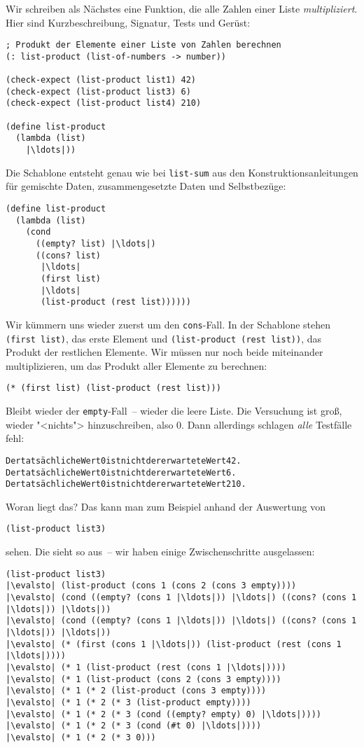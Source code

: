 Wir schreiben als Nächstes eine Funktion, die alle Zahlen einer Liste
\emph{multipliziert}.   Hier sind Kurzbeschreibung, Signatur, Tests
und Gerüst:
%
\begin{lstlisting}
; Produkt der Elemente einer Liste von Zahlen berechnen
(: list-product (list-of-numbers -> number))

(check-expect (list-product list1) 42)
(check-expect (list-product list3) 6)
(check-expect (list-product list4) 210)

(define list-product
  (lambda (list)
    |\ldots|))
\end{lstlisting}
%
Die Schablone entsteht genau wie bei \lstinline{list-sum} aus den
Konstruktionsanleitungen für gemischte Daten, zusammengesetzte Daten
und Selbstbezüge:
%
\begin{lstlisting}
(define list-product
  (lambda (list)
    (cond
      ((empty? list) |\ldots|)
      ((cons? list)
       |\ldots|
       (first list) 
       |\ldots|
       (list-product (rest list))))))
\end{lstlisting}
%
Wir kümmern uns wieder zuerst um den
\lstinline{cons}-Fall. In der Schablone stehen \lstinline{(first list)}, das erste
Element und \lstinline{(list-product (rest list))}, das Produkt der
restlichen Elemente.  Wir müssen nur noch beide miteinander
multiplizieren, um das Produkt aller Elemente zu berechnen:
%
\begin{lstlisting}
(* (first list) (list-product (rest list)))
\end{lstlisting}
%
Bleibt wieder der \lstinline{empty}-Fall~-- wieder die leere Liste.
Die Versuchung ist groß, wieder "<nichts"> hinzuschreiben, also 0.
Dann allerdings schlagen \emph{alle} Testfälle fehl:
\begin{alltt}
Der tatsächliche Wert 0 ist nicht der erwartete Wert 42.
Der tatsächliche Wert 0 ist nicht der erwartete Wert 6.
Der tatsächliche Wert 0 ist nicht der erwartete Wert 210.
\end{alltt}
%
Woran liegt das?  Das kann man zum Beispiel anhand der Auswertung von
%
\begin{lstlisting}
(list-product list3)
\end{lstlisting}
%
sehen.  Die sieht so aus~-- wir haben
einige Zwischenschritte ausgelassen:
%
\begin{lstlisting}
(list-product list3)
|\evalsto| (list-product (cons 1 (cons 2 (cons 3 empty))))
|\evalsto| (cond ((empty? (cons 1 |\ldots|)) |\ldots|) ((cons? (cons 1 |\ldots|)) |\ldots|))
|\evalsto| (cond ((empty? (cons 1 |\ldots|)) |\ldots|) ((cons? (cons 1 |\ldots|)) |\ldots|))
|\evalsto| (* (first (cons 1 |\ldots|)) (list-product (rest (cons 1 |\ldots|))))
|\evalsto| (* 1 (list-product (rest (cons 1 |\ldots|))))
|\evalsto| (* 1 (list-product (cons 2 (cons 3 empty))))
|\evalsto| (* 1 (* 2 (list-product (cons 3 empty))))
|\evalsto| (* 1 (* 2 (* 3 (list-product empty))))
|\evalsto| (* 1 (* 2 (* 3 (cond ((empty? empty) 0) |\ldots|))))
|\evalsto| (* 1 (* 2 (* 3 (cond (#t 0) |\ldots|))))
|\evalsto| (* 1 (* 2 (* 3 0)))
\end{lstlisting}
